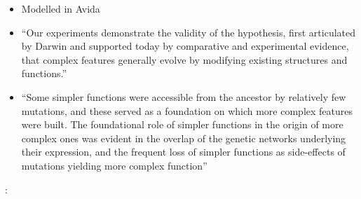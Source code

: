 \begin{itemize}
	\item
	
	Modelled in Avida
	
	\item
	
	``Our experiments demonstrate the validity of the hypothesis, first
	articulated by Darwin and supported today by comparative and
	experimental evidence, that complex features generally evolve by
	modifying existing structures and functions.''
	
	\item
	
	``Some simpler functions were accessible from the ancestor by
	relatively few mutations, and these served as a foundation on which
	more complex features were built. The foundational role of simpler
	functions in the origin of more complex ones was evident in the
	overlap of the genetic networks underlying their expression, and the
	frequent loss of simpler functions as side-effects of mutations
	yielding more complex function''
	
\end{itemize}

\autocite{Taylor2001}:

